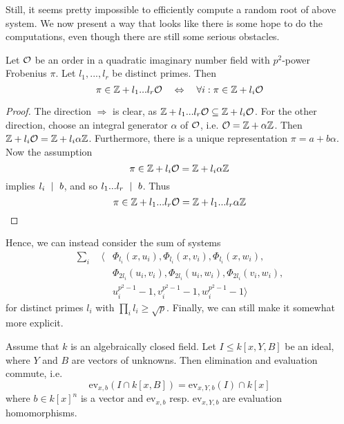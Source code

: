 Still, it seems pretty impossible to efficiently compute a random root of above system.
We now present a way that looks like there is some hope to do the computations, even though there are still some serious obstacles.
\begin{prop}
    Let $\mathcal{O}$ be an order in a quadratic imaginary number field with $p^2$-power Frobenius $\pi$.
    Let $l_1, ..., l_r$ be distinct primes.
    Then
    \begin{equation*}
        \pi \in \mathbb{Z} + l_1 ... l_r \mathcal{O} \quad \Leftrightarrow \quad \forall i: \pi \in \mathbb{Z} + l_i \mathcal{O}
    \end{equation*}
\end{prop}
\begin{proof}
    The direction $\Rightarrow$ is clear, as $\mathbb{Z} + l_1 ... l_r \mathcal{O} \subseteq \mathbb{Z} + l_i\mathcal{O}$.
    For the other direction, choose an integral generator $\alpha$ of $\mathcal{O}$, i.e. $\mathcal{O} = \mathbb{Z} + \alpha\mathbb{Z}$.
    Then $\mathbb{Z} + l_i\mathcal{O} = \mathbb{Z} + l_i\alpha\mathbb{Z}$.
    Furthermore, there is a unique representation $\pi = a + b\alpha$.
    Now the assumption
    \begin{equation*}
        \pi \in \mathbb{Z} + l_i\mathcal{O} = \mathbb{Z} + l_i\alpha\mathbb{Z}
    \end{equation*}
    implies $l_i \ \mid \  b$, and so $l_1 ... l_r \ \mid \  b$.
    Thus
    \begin{equation*}
        \pi \in \mathbb{Z} + l_1 ... l_r \mathcal{O} = \mathbb{Z} + l_1 ... l_r \alpha \mathbb{Z} \qedhere
    \end{equation*}
\end{proof}
Hence, we can instead consider the sum of systems
\begin{align*}
    \sum_i \quad \langle &\Phi_{l_i}(x, u_i), \Phi_{l_i}(x, v_i), \Phi_{l_i}(x, w_i), \\
    &\Phi_{2l_i}(u_i, v_i), \Phi_{2l_i}(u_i, w_i), \Phi_{2l_i}(v_i, w_i), \\
    &u_i^{p^2 - 1} - 1, v_i^{p^2 - 1} - 1, w_i^{p^2 - 1} - 1 \rangle 
\end{align*}
for distinct primes $l_i$ with $\prod_i l_i \geq \sqrt{p}$.
Finally, we can still make it somewhat more explicit.
\begin{lemma}
    Assume that $k$ is an algebraically closed field.
    Let $I \leq k[x, Y, B]$ be an ideal, where $Y$ and $B$ are vectors of unknowns.
    Then elimination and evaluation commute, i.e.
    \begin{equation*}
        \mathrm{ev}_{x, b}(I \cap k[x, B]) = \mathrm{ev}_{x, Y, b}(I) \cap k[x]
    \end{equation*}
    where $b \in k[x]^n$ is a vector and $\mathrm{ev}_{x, b}$ resp. $\mathrm{ev}_{x, Y, b}$ are evaluation homomorphisms.
\end{lemma}

